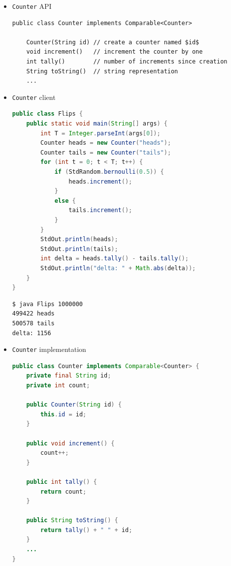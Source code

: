 \documentclass[8pt,a4paper,compress]{beamer}
\begin{document}
\begin{frame}[fragile]
\begin{itemize}
\item \lstinline{Counter} API
\begin{lstlisting}[language={},mathescape]
public class Counter implements Comparable<Counter> 

    Counter(String id) // create a counter named $id$
    void increment()   // increment the counter by one
    int tally()        // number of increments since creation
    String toString()  // string representation
    ...
\end{lstlisting}

\item \lstinline{Counter} client
\begin{lstlisting}[language=Java]
public class Flips {
    public static void main(String[] args) {
        int T = Integer.parseInt(args[0]);
        Counter heads = new Counter("heads");
        Counter tails = new Counter("tails");
        for (int t = 0; t < T; t++) {
            if (StdRandom.bernoulli(0.5)) {
                heads.increment();
            }
            else {
                tails.increment();
            }
        }
        StdOut.println(heads);
        StdOut.println(tails);
        int delta = heads.tally() - tails.tally();
        StdOut.println("delta: " + Math.abs(delta));
    }
}
\end{lstlisting}

\begin{lstlisting}[language={}]
$ java Flips 1000000
499422 heads
500578 tails
delta: 1156
\end{lstlisting}
\end{itemize}
\end{frame}

\begin{frame}[fragile]
\begin{itemize}
\item \lstinline{Counter} implementation
\begin{lstlisting}[language=Java]
public class Counter implements Comparable<Counter> {
    private final String id;
    private int count;

    public Counter(String id) { 
        this.id = id; 
    }

    public void increment() { 
        count++; 
    }

    public int tally() { 
        return count; 
    }

    public String toString() { 
        return tally() + " " + id; 
    }
    ...
}
\end{lstlisting}
\end{itemize}
\end{frame}
\end{document}

